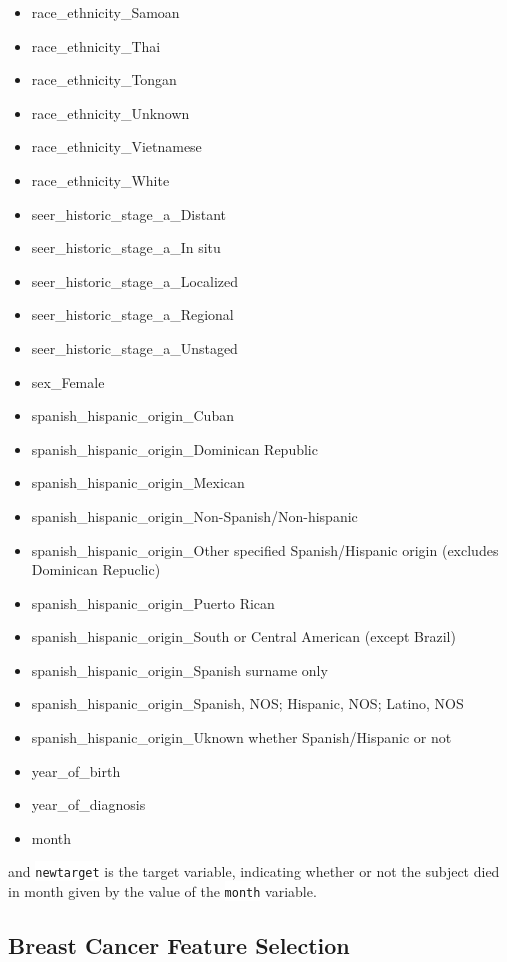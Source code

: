 \documentclass[a4paper,11pt]{article}
\newcommand{\codewhite}[1]{\colorbox{white}{\texttt{#1}}}
\begin{document}
\begin{itemize}[noitemsep]
\item race\_ethnicity\_Samoan
\item race\_ethnicity\_Thai
\item race\_ethnicity\_Tongan
\item race\_ethnicity\_Unknown
\item race\_ethnicity\_Vietnamese
\item race\_ethnicity\_White
\item seer\_historic\_stage\_a\_Distant
\item seer\_historic\_stage\_a\_In situ
\item seer\_historic\_stage\_a\_Localized
\item seer\_historic\_stage\_a\_Regional
\item seer\_historic\_stage\_a\_Unstaged
\item sex\_Female
\item spanish\_hispanic\_origin\_Cuban
\item spanish\_hispanic\_origin\_Dominican Republic
\item spanish\_hispanic\_origin\_Mexican
\item spanish\_hispanic\_origin\_Non-Spanish/Non-hispanic
\item spanish\_hispanic\_origin\_Other specified Spanish/Hispanic origin (excludes Dominican Repuclic)
\item spanish\_hispanic\_origin\_Puerto Rican
\item spanish\_hispanic\_origin\_South or Central American (except Brazil)
\item spanish\_hispanic\_origin\_Spanish surname only
\item spanish\_hispanic\_origin\_Spanish, NOS; Hispanic, NOS; Latino, NOS
\item spanish\_hispanic\_origin\_Uknown whether Spanish/Hispanic or not
\item year\_of\_birth
\item year\_of\_diagnosis
\item month
\end{itemize}


and 
\codewhite{newtarget} is the target variable, indicating whether or not the subject died in month given by the value of the \codewhite{month} variable.


\subsection{Breast Cancer Feature Selection}
\label{subsec:breastfeatures}
\end{document}
